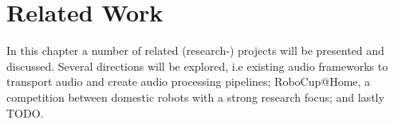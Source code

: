 
\chapter{Related Work}

In this chapter a number of related (research-) projects will be presented and discussed. 
Several directions will be explored, i.e existing audio frameworks to transport audio and create audio processing pipelines; RoboCup@Home, a competition between domestic robots with a strong research focus; and lastly TODO.




